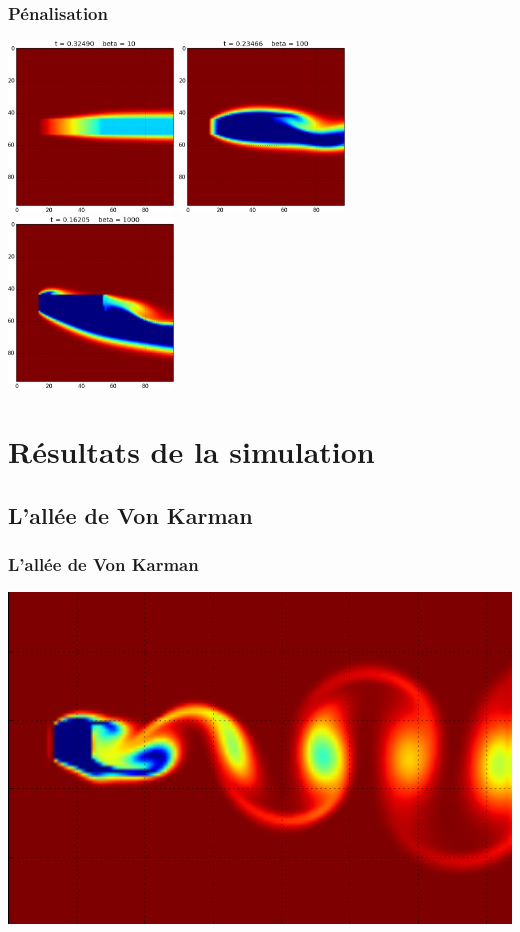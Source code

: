 \documentclass{beamer}
\begin{document}
  \begin{frame}
    \frametitle{Pénalisation}
    \begin{center}
      \includegraphics[width=0.33\textwidth]{penalisation_10.png}
      \includegraphics[width=0.33\textwidth]{penalisation_100.png}
      \includegraphics[width=0.33\textwidth]{penalisation_1000.png}
    \end{center}
  \end{frame}
\section{Résultats de la simulation}

 \subsection{L'allée de Von Karman}
 	\begin{frame}
 		\frametitle{L'allée de Von Karman}
 		\centering \includegraphics[height= 0.7 \textheight]{VK_pas_mal.png}	
 	\end{frame}
 
\end{document}
